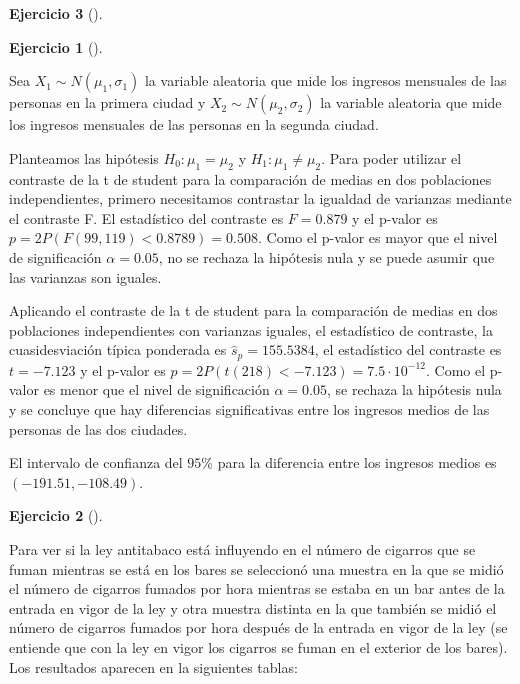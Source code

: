 \documentclass[
  a4paper,
]{scrreport}
\theoremstyle{definition}
\newtheorem{exercise}{Ejercicio}[chapter]
\theoremstyle{remark}
\begin{document}
\begin{exercise}[]
\begin{exercise}[]
\end{exercise}

\begin{tcolorbox}[enhanced jigsaw, leftrule=.75mm, colbacktitle=quarto-callout-tip-color!10!white, opacityback=0, colback=white, toprule=.15mm, colframe=quarto-callout-tip-color-frame, coltitle=black, left=2mm, title=\textcolor{quarto-callout-tip-color}{\faLightbulb}\hspace{0.5em}{Solución}, breakable, bottomtitle=1mm, bottomrule=.15mm, opacitybacktitle=0.6, toptitle=1mm, arc=.35mm, titlerule=0mm, rightrule=.15mm]

Sea \(X_1\sim N(\mu_1, \sigma_1)\) la variable aleatoria que mide los
ingresos mensuales de las personas en la primera ciudad y
\(X_2\sim N(\mu_2, \sigma_2)\) la variable aleatoria que mide los
ingresos mensuales de las personas en la segunda ciudad.

Planteamos las hipótesis \(H_0: \mu_1=\mu_2\) y
\(H_1: \mu_1\neq \mu_2\). Para poder utilizar el contraste de la t de
student para la comparación de medias en dos poblaciones independientes,
primero necesitamos contrastar la igualdad de varianzas mediante el
contraste F. El estadístico del contraste es \(F=0.879\) y el p-valor es
\(p =2 P(F(99,119)<0.8789) = 0.508\). Como el p-valor es mayor que el
nivel de significación \(\alpha = 0.05\), no se rechaza la hipótesis
nula y se puede asumir que las varianzas son iguales.

Aplicando el contraste de la t de student para la comparación de medias
en dos poblaciones independientes con varianzas iguales, el estadístico
de contraste, la cuasidesviación típica ponderada es
\(\hat s_p = 155.5384\), el estadístico del contraste es \(t= -7.123\) y
el p-valor es \(p =2 P(t(218)<-7.123) = 7.5\cdot 10^{-12}\). Como el
p-valor es menor que el nivel de significación \(\alpha = 0.05\), se
rechaza la hipótesis nula y se concluye que hay diferencias
significativas entre los ingresos medios de las personas de las dos
ciudades.

El intervalo de confianza del \(95\)\% para la diferencia entre los
ingresos medios es \((-191.51, -108.49)\).

\end{tcolorbox}

\begin{exercise}[]\protect\hypertarget{exr-contraste-medias-cigarros}{}\label{exr-contraste-medias-cigarros}

Para ver si la ley antitabaco está influyendo en el número de cigarros
que se fuman mientras se está en los bares se seleccionó una muestra en
la que se midió el número de cigarros fumados por hora mientras se
estaba en un bar antes de la entrada en vigor de la ley y otra muestra
distinta en la que también se midió el número de cigarros fumados por
hora después de la entrada en vigor de la ley (se entiende que con la
ley en vigor los cigarros se fuman en el exterior de los bares). Los
resultados aparecen en la siguientes tablas:


\end{exercise}
\end{exercise}
\end{document}
